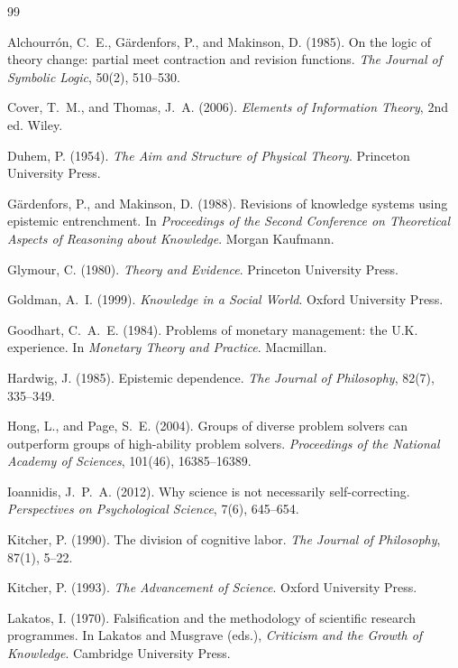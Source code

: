 \documentclass[11pt]{article}
\theoremstyle{remark}
\begin{document}
\begin{thebibliography}{99}

Alchourr\'on, C.~E., G\"ardenfors, P., and Makinson, D. (1985). On the logic of theory change: partial meet contraction and revision functions. \emph{The Journal of Symbolic Logic}, 50(2), 510--530.

Cover, T.~M., and Thomas, J.~A. (2006). \emph{Elements of Information Theory}, 2nd ed. Wiley.

Duhem, P. (1954). \emph{The Aim and Structure of Physical Theory}. Princeton University Press.

G\"ardenfors, P., and Makinson, D. (1988). Revisions of knowledge systems using epistemic entrenchment. In \emph{Proceedings of the Second Conference on Theoretical Aspects of Reasoning about Knowledge}. Morgan Kaufmann.

Glymour, C. (1980). \emph{Theory and Evidence}. Princeton University Press.

Goldman, A.~I. (1999). \emph{Knowledge in a Social World}. Oxford University Press.

Goodhart, C.~A.~E. (1984). Problems of monetary management: the U.K. experience. In \emph{Monetary Theory and Practice}. Macmillan.

Hardwig, J. (1985). Epistemic dependence. \emph{The Journal of Philosophy}, 82(7), 335--349.

Hong, L., and Page, S.~E. (2004). Groups of diverse problem solvers can outperform groups of high-ability problem solvers. \emph{Proceedings of the National Academy of Sciences}, 101(46), 16385--16389.

Ioannidis, J.~P.~A. (2012). Why science is not necessarily self-correcting. \emph{Perspectives on Psychological Science}, 7(6), 645--654.

Kitcher, P. (1990). The division of cognitive labor. \emph{The Journal of Philosophy}, 87(1), 5--22.

Kitcher, P. (1993). \emph{The Advancement of Science}. Oxford University Press.

Lakatos, I. (1970). Falsification and the methodology of scientific research programmes. In Lakatos and Musgrave (eds.), \emph{Criticism and the Growth of Knowledge}. Cambridge University Press.


\end{thebibliography}
\end{document}
